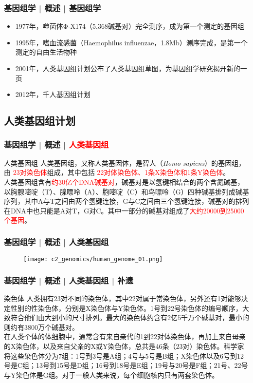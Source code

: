 \begin{frame}
  \frametitle{基因组学 | 概述 | 基因组学}
  \begin{itemize}[<+->]
    \item 1977年，噬菌体Φ-X174（5,368碱基对）完全测序，成为第一个测定的基因组
    \item 1995年，嗜血流感菌（Haemophilus influenzae，1.8Mb）测序完成，是第一个测定的自由生活物种
    \item 2001年，人类基因组计划公布了人类基因组草图，为基因组学研究揭开新的一页
    \item 2012年，千人基因组计划
  \end{itemize}
\end{frame}

\subsection{人类基因组计划}
\begin{frame}
  \frametitle{基因组学 | 概述 | \textcolor{red}{人类基因组}}
  \begin{block}{人类基因组}
    人类基因组，又称人类基因体，是智人（\textit{Homo sapiens}）的基因组，由 \textcolor{red}{23对染色体}组成，其中包括 \textcolor{red}{22对体染色体、1条X染色体和1条Y染色体}。\\
    \vspace{1em}
人类基因组含有\textcolor{red}{约30亿个DNA碱基对}，碱基对是以氢键相结合的两个含氮碱基，以胸腺嘧啶（T）、腺嘌呤（A）、胞嘧啶（C）和鸟嘌呤（G）四种碱基排列成碱基序列，其中A与T之间由两个氢键连接，G与C之间由三个氢键连接，碱基对的排列在DNA中也只能是A对T，G对C。其中一部分的碱基对组成了\textcolor{red}{大约20000到25000个基因}。 
  \end{block}
\end{frame}

\begin{frame}
  \frametitle{基因组学 | 概述 | 人类基因组}
  \begin{figure}
    \centering
    \texttt{[image: c2\_genomics/human\_genome\_01.png]}
  \end{figure}
\end{frame}

\begin{frame}
  \frametitle{基因组学 | 概述 | 人类基因组 | 补遗}
  \begin{block}{染色体}
人类拥有23对不同的染色体，其中22对属于常染色体，另外还有1对能够决定性别的性染色体，分别是X染色体与Y染色体。1号到22号染色体的编号顺序，大致符合他们由大到小的尺寸排列。最大的染色体约含有2亿5千万个碱基对，最小的则约有3800万个碱基对。\\
\vspace{1em}
在人类个体的体细胞中，通常含有来自亲代的1到22对体染色体，再加上来自母亲的X染色体，以及来自父亲的X或Y染色体，总共是46条（23对）染色体。科学家将这些染色体分为7组：1号到3号是A组；4号与5号是B组；X染色体以及6号到12号是C组；13号到15号是D组；16号到18号是E组；19号与20号是F组；21号、22号与Y染色体是G组。对于一般人类来说，每个细胞核内只有两套染色体。
  \end{block}
\end{frame}


